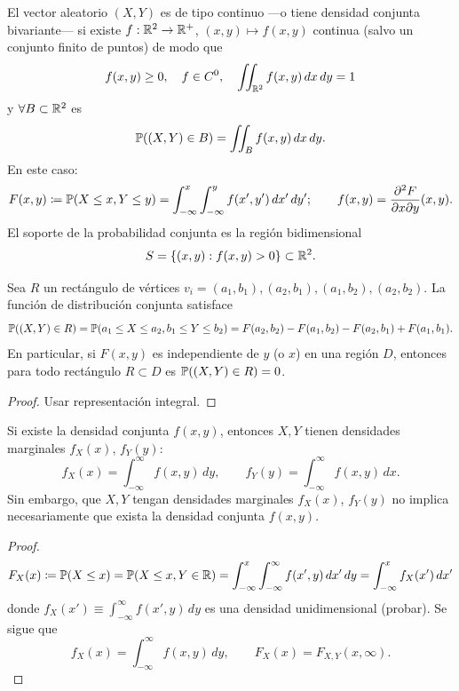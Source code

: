 \begin{definicion}[16]
El vector aleatorio $(X, Y)$ es de tipo continuo —o tiene densidad conjunta bivariante— si existe $f : \mathbb{R}^2 \to \mathbb{R}^+$, $(x,y) \mapsto f(x,y)$ continua (salvo un conjunto finito de puntos) de modo que
\[
  f(x,y) \ge 0, \quad f \in C^0, \quad \iint_{\mathbb{R}^2} f(x,y)\,dx\,dy = 1
\]
y $\forall B \subset \mathbb{R}^2$ es
\begin{equation*}
  \mathbb{P}((X, Y) \in B) = \iint_B f(x,y)\,dx\,dy.
\end{equation*}
En este caso:
\begin{equation*}
  F(x,y) \coloneqq \mathbb{P}(X \le x, Y \le y) = \int_{-\infty}^x \int_{-\infty}^y f(x', y')\,dx'\,dy'; \qquad f(x,y) = \frac{\partial^2 F}{\partial x \partial y}(x,y).
\end{equation*}
El soporte de la probabilidad conjunta es la región bidimensional
\[
  S = \{(x,y) : f(x,y) > 0\} \subset \mathbb{R}^2.
\]
\end{definicion}
\textcolor{azulresalt}{
\begin{proposicion}[19]
Sea $R$ un rectángulo de vértices $v_i = (a_1, b_1), (a_2, b_1), (a_1, b_2), (a_2, b_2)$. La función de distribución conjunta satisface
\[
  \mathbb{P}((X, Y) \in R) = \mathbb{P}(a_1 \le X \le a_2, b_1 \le Y \le b_2) = F(a_2, b_2) - F(a_1, b_2) - F(a_2, b_1) + F(a_1, b_1).
\]
En particular, si $F(x,y)$ es independiente de $y$ (o $x$) en una región $D$, entonces para todo rectángulo $R \subset D$ es $\mathbb{P}((X, Y) \in R) = 0$.
\end{proposicion}
\begin{proof}
Usar representación integral.
\end{proof}}

\begin{proposicion}[20]
Si existe la densidad conjunta $f(x,y)$, entonces $X, Y$ tienen densidades marginales $f_X(x)$, $f_Y(y)$:
\begin{equation*}
  f_X(x) = \int_{-\infty}^\infty f(x,y)\,dy, \qquad f_Y(y) = \int_{-\infty}^\infty f(x,y)\,dx.
\end{equation*}
Sin embargo, que $X, Y$ tengan densidades marginales $f_X(x)$, $f_Y(y)$ no implica necesariamente que exista la densidad conjunta $f(x,y)$.
\end{proposicion}

\begin{proof}
\[
  F_X(x) \coloneqq \mathbb{P}(X \le x) = \mathbb{P}(X \le x, Y \in \mathbb{R}) = \int_{-\infty}^x \int_{-\infty}^\infty f(x', y)\,dx'\,dy = \int_{-\infty}^x f_X(x')\,dx'
\]
donde $f_X(x') \equiv \int_{-\infty}^\infty f(x', y)\,dy$ es una densidad unidimensional (probar). Se sigue que
\begin{equation*}
  f_X(x) = \int_{-\infty}^\infty f(x,y)\,dy, \qquad F_X(x) = F_{X,Y}(x, \infty).
\end{equation*}
\end{proof}

